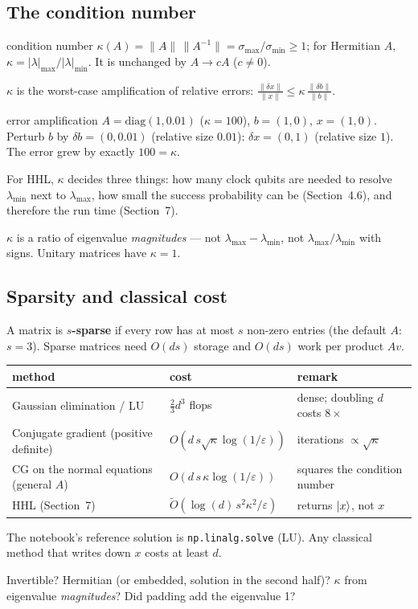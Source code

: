 \documentclass[11pt,a4paper,openany]{book}
\newcounter{wex}[chapter]
\begin{document}
\subsection{The condition number}
\begin{defn}{condition number}
$\kappa(A) = \|A\|\,\|A^{-1}\| = \sigma_{\max}/\sigma_{\min} \ge 1$; for Hermitian $A$, $\kappa = |\lambda|_{\max}/|\lambda|_{\min}$. It is unchanged by $A \to cA$ ($c \ne 0$).
\end{defn}
$\kappa$ is the worst-case amplification of relative errors: $\frac{\|\delta x\|}{\|x\|} \le \kappa\,\frac{\|\delta b\|}{\|b\|}$.
\begin{wexample}{error amplification}
$A = \mathrm{diag}(1, 0.01)$ ($\kappa = 100$), $b = (1, 0)$, $x = (1, 0)$. Perturb $b$ by $\delta b = (0, 0.01)$ (relative size $0.01$): $\delta x = (0, 1)$ (relative size $1$).
The error grew by exactly $100 = \kappa$.
\end{wexample}
For HHL, $\kappa$ decides three things: how many clock qubits are needed to resolve $\lambda_{\min}$ next to $\lambda_{\max}$, how small the
success probability can be (Section~4.6), and therefore the run time (Section~7).
\begin{trap}
$\kappa$ is a ratio of eigenvalue \emph{magnitudes} --- not $\lambda_{\max} - \lambda_{\min}$, not $\lambda_{\max}/\lambda_{\min}$ with signs. Unitary matrices have $\kappa = 1$.
\end{trap}

\subsection{Sparsity and classical cost}
A matrix is \textbf{$s$-sparse} if every row has at most $s$ non-zero entries (the default $A$: $s = 3$). Sparse matrices need $O(ds)$ storage and
$O(ds)$ work per product $Av$.
\begin{center}\small
\begin{tabular}{lll}
\toprule method & cost & remark\\ \midrule
Gaussian elimination / LU & $\frac23d^3$ flops & dense; doubling $d$ costs $8\times$\\
Conjugate gradient (positive definite) & $O(d\,s\sqrt\kappa\log(1/\varepsilon))$ & iterations $\propto\sqrt\kappa$\\
CG on the normal equations (general $A$) & $O(d\,s\,\kappa\log(1/\varepsilon))$ & squares the condition number\\
HHL (Section~7) & $\tilde O(\log(d)\,s^2\kappa^2/\varepsilon)$ & returns $\ket x$, not $x$\\ \bottomrule
\end{tabular}
\end{center}
The notebook's reference solution is \texttt{np.linalg.solve} (LU). Any classical method that writes down $x$ costs at least $d$.
\begin{checklist}
Invertible? Hermitian (or embedded, solution in the second half)? $\kappa$ from eigenvalue \emph{magnitudes}? Did padding add the eigenvalue 1?
\end{checklist}
\end{document}
